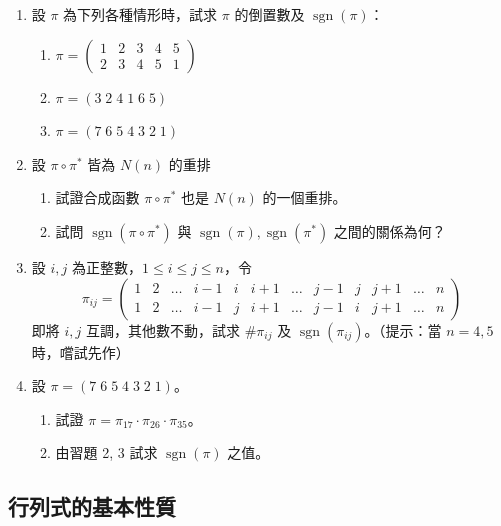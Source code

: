 \begin{enumerate}[label=\arabic*., leftmargin=2em]
  \item 設 $\pi$ 為下列各種情形時，試求 $\pi$ 的倒置數及 $\operatorname{sgn}(\pi)$：
  \begin{enumerate}[label=(\roman*)]
    \item $\pi = \begin{pmatrix} 1 & 2 & 3 & 4 & 5 \\ 2 & 3 & 4 & 5 & 1 \end{pmatrix}$
    \item $\pi = (3 \; 2 \; 4 \; 1 \; 6 \; 5)$
    \item $\pi = (7 \; 6 \; 5 \; 4 \; 3 \; 2 \; 1)$
  \end{enumerate}

  \item[\textbf{*2.}] 設 $\pi \circ \pi^*$ 皆為 $N(n)$ 的重排
  \begin{enumerate}[label=(\roman*)]
    \item 試證合成函數 $\pi \circ \pi^*$ 也是 $N(n)$ 的一個重排。
    \item 試問 $\operatorname{sgn}(\pi \circ \pi^*)$ 與 $\operatorname{sgn}(\pi), \operatorname{sgn}(\pi^*)$ 之間的關係為何？
  \end{enumerate}

  \item[\textbf{*3.}] 設 $i, j$ 為正整數，$1 \le i \le j \le n$，令
  \[ \pi_{ij} = \begin{pmatrix}
  1 & 2 & \dots & i-1 & i & i+1 & \dots & j-1 & j & j+1 & \dots & n \\
  1 & 2 & \dots & i-1 & j & i+1 & \dots & j-1 & i & j+1 & \dots & n
  \end{pmatrix} \]
  即將 $i, j$ 互調，其他數不動，試求 $\#\pi_{ij}$ 及 $\operatorname{sgn}(\pi_{ij})$。（提示：當 $n=4, 5$ 時，嚐試先作）

  \item 設 $\pi = (7 \; 6 \; 5 \; 4 \; 3 \; 2 \; 1)$。
  \begin{enumerate}[label=(\roman*)]
    \item 試證 $\pi = \pi_{17} \cdot \pi_{26} \cdot \pi_{35}$。
    \item 由習題 2, 3 試求 $\operatorname{sgn}(\pi)$ 之值。
  \end{enumerate}
\end{enumerate}

\subsection{行列式的基本性質}\label{sec:b6-1-4}
\resetsectcounters

